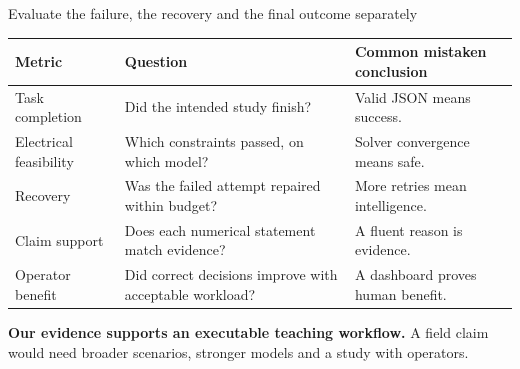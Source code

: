 \begin{frame}[t]{Evaluate the failure, the recovery and the final outcome separately}

\begin{tabular}{@{}>{\raggedright\arraybackslash}p{.23\linewidth}>{\raggedright\arraybackslash}p{.32\linewidth}>{\raggedright\arraybackslash}p{.37\linewidth}@{}}
\toprule Metric & Question & Common mistaken conclusion \\
\midrule
Task completion & Did the intended study finish? & Valid JSON means success. \\
Electrical feasibility & Which constraints passed, on which model? & Solver convergence means safe. \\
Recovery & Was the failed attempt repaired within budget? & More retries mean intelligence. \\
Claim support & Does each numerical statement match evidence? & A fluent reason is evidence. \\
Operator benefit & Did correct decisions improve with acceptable workload? & A dashboard proves human benefit. \\
\bottomrule
\end{tabular}\par
\par\medskip
\textbf{Our evidence supports an executable teaching workflow.} A field claim would need broader scenarios, stronger models and a study with operators.

\end{frame}

